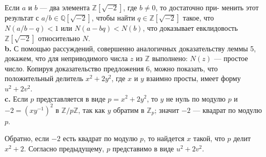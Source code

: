 \documentclass{mai_book}
\begin{document}
Если $a$ и $b$ --- два элемента $\mathbb{Z}[\sqrt{-2}]$, где $b\neq0$, то достаточно при-\linebreak
менить этот результат с $a/b\in\mathbb{Q}[\sqrt{-2}]$, чтобы найти $q\in\mathbb{Z}[\sqrt{-2}]$ такое,\linebreak
что $N(a/b-q)<1$ или $N(a-bq)<N(b)$, что доказывает евклидовость
$\mathbb{Z}[\sqrt{-2}]$ относительно $N$.\newline
\\ 
\hspace*{15pt}\textbf{b.} С помощью рассуждений, совершенно аналогичных доказатель­ству\linebreak
леммы 5, докажем, что для неприводимого числа $z$ из $\mathbb{Z}$ выполнено:\linebreak
$N(z)$ --- простое число. Копируя доказательство предложения 6, мож­но\linebreak
показать, что положительный делитель $x^2+2y^2$, где $x$ и $y$ взаимно\linebreak
просты, имеет форму $u^2+2v^2$.\newline
\\
\hspace*{15pt}\textbf{c.} Если $p$ представляется в виде $p=x^2+2y^2$, то $y$ не нуль по модулю\linebreak
$p$ и $-2=(xy^{-1})^2$ в $\mathbb{Z}/p\mathbb{Z}$, так как $y$ обратим в $\mathbb{Z}_p$; значит $-2$ --- квадрат\linebreak
по модулю $p$.

Обратно, если $-2$ есть квадрат по модулю $p$, то найдется $x$\linebreak 
та­кой, что $p$ делит $x^2+2$. Согласно предыдущему, $p$ представимо в виде\linebreak
$u^2+2v^2$.\newline
\\
\end{document}
